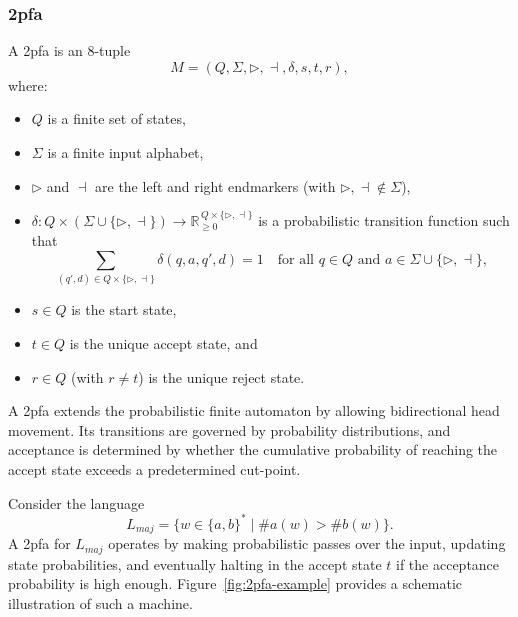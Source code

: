 
\subsubsection{\acrfull{2pfa}}
\label{subsubsec:2pfa}

\begin{definition}
A \gls{2pfa} is an 8-tuple
\[
M = (Q, \Sigma, \triangleright, \dashv, \delta, s, t, r),
\]
where:
\begin{itemize}
    \item \(Q\) is a finite set of states,
    \item \(\Sigma\) is a finite input alphabet,
    \item \(\triangleright\) and \(\dashv\) are the left and right endmarkers (with \(\triangleright,\dashv \notin \Sigma\)),
    \item \(\delta: Q \times (\Sigma \cup \{\triangleright,\dashv\}) \to \mathbb{R}_{\ge 0}^{\,Q \times \{\triangleright,\dashv\}}\) is a probabilistic transition function such that
    \[
    \sum_{(q',d)\in Q\times\{\triangleright,\dashv\}} \delta(q,a,q',d) = 1 \quad \text{for all } q \in Q \text{ and } a \in \Sigma \cup \{\triangleright,\dashv\},
    \]
    \item \(s\in Q\) is the start state,
    \item \(t\in Q\) is the unique accept state, and
    \item \(r\in Q\) (with \(r\neq t\)) is the unique reject state.
\end{itemize}
\end{definition}

\begin{remark}
A \gls{2pfa} extends the probabilistic finite automaton by allowing bidirectional head movement. Its transitions are governed by probability distributions, and acceptance is determined by whether the cumulative probability of reaching the accept state exceeds a predetermined cut-point.
\end{remark}

\begin{example}
Consider the language 
\[
L_{maj} = \{ w \in \{a,b\}^* \mid \#a(w) > \#b(w) \}.
\]
A \gls{2pfa} for \(L_{maj}\) operates by making probabilistic passes over the input, updating state probabilities, and eventually halting in the accept state \(t\) if the acceptance probability is high enough. Figure~\ref{fig:2pfa-example} provides a schematic illustration of such a machine.
\end{example}

